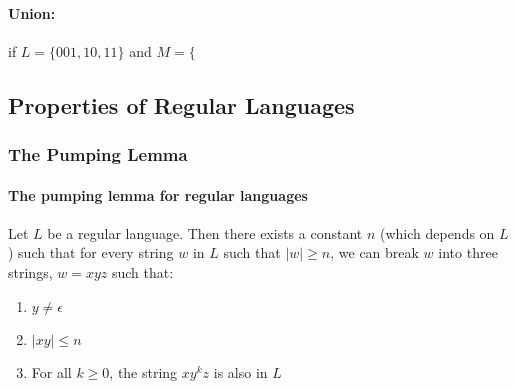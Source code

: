 \documentclass[20pt]{article} %
\begin{document}
\paragraph{Union:} if $L = \{001,10,11\}$ and $M = \{$
\subsection{Properties of Regular Languages}
\subsubsection{The Pumping Lemma}
\paragraph{The pumping lemma for regular languages}  Let $L$ be a regular language. Then there exists a constant $n$ (which depends on $L$) such that for every string $w$ in $L$ such that $|w| \geq n$, we can break $w$ into three strings, $w = xyz$ such that:
\begin{enumerate}
\item $y \neq \epsilon$
\item $|xy| \leq n$
\item For all $k \geq 0$, the string $xy^{k}z$ is also in $L$
\end{enumerate}
\end{document}
